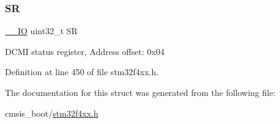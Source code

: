 \subsubsection{\texorpdfstring{SR}{SR}}
{\footnotesize\ttfamily \hyperlink{group___c_m_s_i_s__core__definitions_gaec43007d9998a0a0e01faede4133d6be}{\+\_\+\+\_\+\+IO} uint32\+\_\+t SR}

D\+C\+MI status register, Address offset\+: 0x04 

Definition at line 450 of file stm32f4xx.\+h.



The documentation for this struct was generated from the following file\+:\begin{DoxyCompactItemize}
\item 
cmsis\+\_\+boot/\hyperlink{stm32f4xx_8h}{stm32f4xx.\+h}\end{DoxyCompactItemize}

